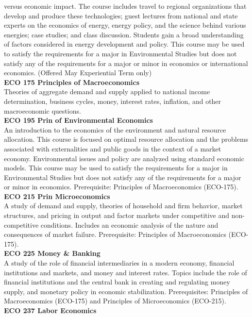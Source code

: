 \documentclass[
  letterpaper,
]{scrbook}
\begin{document}
versus economic impact. The course includes travel to regional
organizations that develop and produce these technologies; guest
lectures from national and state experts on the economics of energy,
energy policy, and the science behind various energies; case studies;
and class discussion. Students gain a broad understanding of factors
considered in energy development and policy. This course may be used to
satisfy the requirements for a major in Environmental Studies but does
not satisfy any of the requirements for a major or minor in economics or
international economics. (Offered May Experiential Term only)\\
\textbf{ECO 175 Principles of Macroeconomics}\\
Theories of aggregate demand and supply applied to national income
determination, business cycles, money, interest rates, inflation, and
other macroeconomic questions.\\
\textbf{ECO 195 Prin of Environmental Economics}\\
An introduction to the economics of the environment and natural resource
allocation. This course is focused on optimal resource allocation and
the problems associated with externalities and public goods in the
context of a market economy. Environmental issues and policy are
analyzed using standard economic models. This course may be used to
satisfy the requirements for a major in Environmental Studies but does
not satisfy any of the requirements for a major or minor in economics.
Prerequisite: Principles of Macroeconomics (ECO-175).\\
\textbf{ECO 215 Prin Microeconomics}\\
A study of demand and supply, theories of household and firm behavior,
market structures, and pricing in output and factor markets under
competitive and non-competitive conditions. Includes an economic
analysis of the nature and consequences of market failure. Prerequisite:
Principles of Macroeconomics (ECO-175).\\
\textbf{ECO 225 Money \& Banking}\\
A study of the role of financial intermediaries in a modern economy,
financial institutions and markets, and money and interest rates. Topics
include the role of financial institutions and the central bank in
creating and regulating money supply, and monetary policy in economic
stabilization. Prerequisites: Principles of Macroeconomics (ECO-175) and
Principles of Microeconomics (ECO-215).\\
\textbf{ECO 237 Labor Economics}\\
\end{document}
